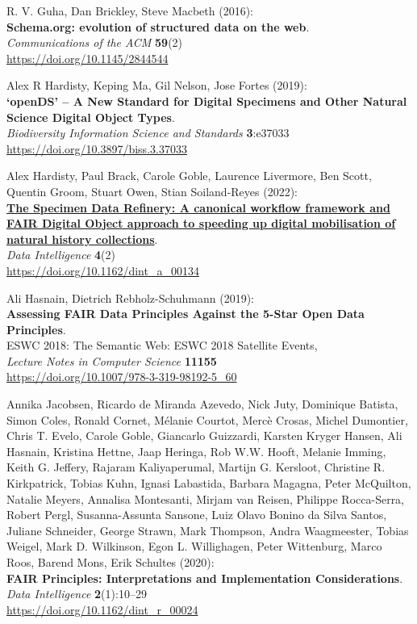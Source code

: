 \begin{thebibliography}{9}
 R. V. Guha, Dan Brickley, Steve Macbeth (2016):\\
\textbf{Schema.org: evolution of structured data on the web}.\\
\emph{Communications of the ACM} \textbf{59}(2)\\
\url{https://doi.org/10.1145/2844544}

 Alex R Hardisty, Keping Ma, Gil Nelson, Jose Fortes
(2019):\\
\textbf{`openDS' -- A New Standard for Digital Specimens and Other
Natural Science Digital Object Types}.\\
\emph{Biodiversity Information Science and Standards}
\textbf{3}:e37033\\
\url{https://doi.org/10.3897/biss.3.37033}

 Alex Hardisty, Paul Brack, Carole Goble, Laurence
Livermore, Ben Scott, Quentin Groom, Stuart Owen, Stian Soiland-Reyes
(2022):\\
\href{../specimen-data-refinery/}{\textbf{The Specimen Data Refinery: A
canonical workflow framework and FAIR Digital Object approach to
speeding up digital mobilisation of natural history collections}}.\\
\emph{Data Intelligence} \textbf{4}(2)\\
\url{https://doi.org/10.1162/dint_a_00134}

 Ali Hasnain, Dietrich Rebholz-Schuhmann (2019):\\
\textbf{Assessing FAIR Data Principles Against the 5-Star Open Data
Principles}.\\
ESWC 2018: The Semantic Web: ESWC 2018 Satellite Events,\\
\emph{Lecture Notes in Computer Science} \textbf{11155}\\
\url{https://doi.org/10.1007/978-3-319-98192-5_60}

 Annika Jacobsen, Ricardo de Miranda Azevedo, Nick
Juty, Dominique Batista, Simon Coles, Ronald Cornet, Mélanie Courtot,
Mercè Crosas, Michel Dumontier, Chris T. Evelo, Carole Goble, Giancarlo
Guizzardi, Karsten Kryger Hansen, Ali Hasnain, Kristina Hettne, Jaap
Heringa, Rob W.W. Hooft, Melanie Imming, Keith G. Jeffery, Rajaram
Kaliyaperumal, Martijn G. Kersloot, Christine R. Kirkpatrick, Tobias
Kuhn, Ignasi Labastida, Barbara Magagna, Peter McQuilton, Natalie
Meyers, Annalisa Montesanti, Mirjam van Reisen, Philippe Rocca-Serra,
Robert Pergl, Susanna-Assunta Sansone, Luiz Olavo Bonino da Silva
Santos, Juliane Schneider, George Strawn, Mark Thompson, Andra
Waagmeester, Tobias Weigel, Mark D. Wilkinson, Egon L. Willighagen,
Peter Wittenburg, Marco Roos, Barend Mons, Erik Schultes (2020):\\
\textbf{FAIR Principles: Interpretations and Implementation
Considerations}.\\
\emph{Data Intelligence} \textbf{2}(1):10--29\\
\url{https://doi.org/10.1162/dint_r_00024}


\end{thebibliography}
